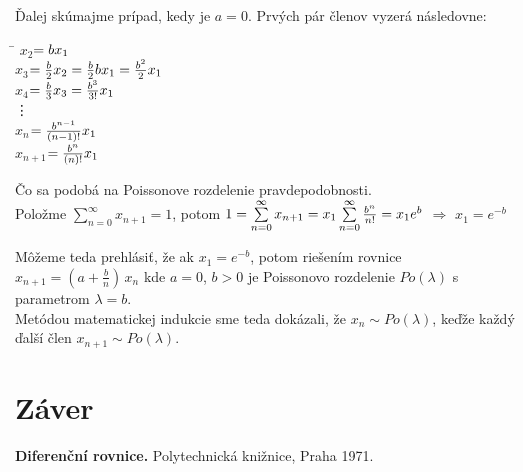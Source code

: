 \documentclass[a4paper,10pt]{article}
\theoremstyle{plain}
\theoremstyle{definition}
\begin{document}
Ďalej skúmajme prípad, kedy je $ a=0 $. Prvých pár členov vyzerá následovne: 
\begin{spacing}{1.6}
\begin{tabbing}
\hspace{1cm}\=\kill
$ x_{2}$\>$=b\*x_{1}    $\\
$ x_{3}$\>$=\frac{b}{2}\*x_{2} = \frac{b}{2}\*b\*x_{1}=\frac{b^{2}}{2}\*x_{1}   $\\
$ x_{4}$\>$=\frac{b}{3}\*x_{3} = \frac{b^{3}}{3!}\*x_{1}  $\\
\vdots \\
$ x_{n}$\>$=\frac{b^{n-1}}{(n-1)!}\*x_{1}    $\\
$ x_{n+1}$\>$=\frac{b^{n}}{(n)!}\*x_{1}    $\\
\end{tabbing} 
\end{spacing}
Čo sa podobá na Poissonove rozdelenie pravdepodobnosti. \\
Položme $ \sum\limits_{n=0}^\infty x_{n+1} = 1 $, potom $ 1=\sum\limits_{n=0}^\infty x_{n+1} = x_{1}\*\sum\limits_{n=0}^\infty \frac{b^{n}}{n!} = x_{1}\*e^{b}$ $ \Rightarrow $ $ x_{1} = e^{-b} $

Môžeme teda prehlásiť, že ak $x_{1}=e^{-b} $, potom riešením rovnice
$x_{n+1}=\left(a+{\frac{b}{n}}\right)\,x_{n}$ kde $a=0$, $b>0$
je Poissonovo rozdelenie $Po(\lambda)$ s parametrom $\lambda=b$.\\
Metódou matematickej indukcie sme teda dokázali, že $x_{n}\sim Po(\lambda)$, keďže každý ďalší člen $x_{n+1}\sim Po(\lambda)$.
\newpage
\section{Záver}


\begin{thebibliography}{9}
               {\bf Diferenční rovnice.}
           Polytechnická knižnice, Praha 1971.
\end{thebibliography}
\end{document}
